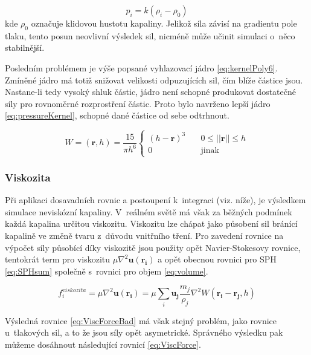 \begin{equation}
	p_i = k(\rho_i - \rho_0)
	\label{eq:idealGasRest}
\end{equation}
kde $\rho_0$ označuje klidovou hustotu kapaliny. Jelikož síla závisí na gradientu pole tlaku, tento posun neovlivní výsledek sil, nicméně může učinit simulaci o~něco stabilnější.

Posledním problémem je výše popsané vyhlazovací jádro \ref{eq:kernelPoly6}. Zmíněné jádro má totiž snižovat velikosti odpuzujících sil, čím blíže částice jsou. Nastane-li tedy vysoký shluk částic, jádro není schopné produkovat dostatečné síly pro rovnoměrné rozprostření částic. Proto bylo navrženo \cite{Desbrun96} lepší jádro \ref{eq:pressureKernel}, schopné dané částice od sebe odtrhnout.

\begin{equation}
	W = (\mathbf{r}, h) = \frac{15}{\pi h^6}
	\begin{cases}
		(h - \mathbf{r})^3 & \quad 0 \leq ||\mathbf{r}|| \leq h \\
		0                  & \quad \text{jinak}
	\end{cases}
	\label{eq:pressureKernel}
\end{equation}

\subsubsection{Viskozita}
Při aplikaci dosavadních rovnic a postoupení k~integraci (viz. níže), je výsledkem simulace neviskózní kapaliny. V~reálném světě má však za běžných podmínek každá kapalina určitou viskozitu. Viskozitu lze chápat jako působení sil bránící kapalině ve změně tvaru z~důvodu vnitřního tření. Pro zavedení rovnice na výpočet síly působící díky viskozitě jsou použity opět Navier-Stokesovy rovnice, tentokrát term pro viskozitu $\mu \nabla^2\mathbf{u}(\mathbf{r_i})$ a opět obecnou rovnici pro SPH \ref{eq:SPHsum} společně s~rovnici pro objem \ref{eq:volume}.

\begin{equation}
	f^{viskozita}_i = \mu \nabla^2\mathbf{u}(\mathbf{r_i}) = \mu \sum_i \mathbf{u_j} \frac{m_j}{\rho_j} \nabla^2 W(\mathbf{r_i} - \mathbf{r_j},h)
	\label{eq:ViscForceBad}
\end{equation}

Výsledná rovnice \ref{eq:ViscForceBad} má však stejný problém, jako rovnice u~tlakových sil, a to že jsou síly opět asymetrické. Správného výsledku pak můžeme dosáhnout následující rovnicí \ref{eq:ViscForce}. \cite{Muller03}

